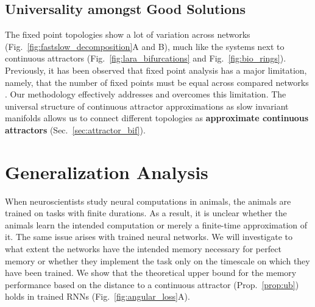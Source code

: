 \documentclass{article} %
\newcounter{ct}
\theoremstyle{definition}
\newtheorem{definition}{Definition}
\theoremstyle{remark}
\begin{document}

\subsection{Universality amongst Good Solutions}


The fixed point topologies show a lot of variation across networks (Fig.~\ref{fig:fastslow_decomposition}A and B),
 much like the systems next to continuous attractors (Fig.~\ref{fig:lara_bifurcations} and Fig.~\ref{fig:bio_rings}).
Previously, it has been observed that fixed point analysis has a major limitation, namely, that the number of fixed points must be equal across compared networks  \citep{maheswaranathan2019universality}.
Our methodology effectively addresses and overcomes this limitation.
The universal structure of continuous attractor approximations as slow invariant manifolds allows us to connect different topologies as \textbf{approximate continuous attractors} (Sec.~\ref{sec:attractor_bif}).








\section{Generalization Analysis}\label{sec:generalization}


When neuroscientists study neural computations in animals, the animals are trained on tasks with finite durations. As a result, it is unclear whether the animals learn the intended computation or merely a finite-time approximation of it. The same issue arises with trained neural networks.
We will investigate to what extent the networks have the intended memory necessary for perfect memory or whether they implement the task only on the timescale on which they have been trained.
We show that the theoretical upper bound for the memory performance based on the distance to a continuous attractor (Prop.~\ref{prop:ub}) holds in trained RNNs (Fig.~\ref{fig:angular_loss}A).
\end{document}

